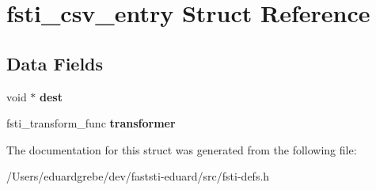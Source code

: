 \hypertarget{structfsti__csv__entry}{}\section{fsti\+\_\+csv\+\_\+entry Struct Reference}
\label{structfsti__csv__entry}
\subsection*{Data Fields}
\begin{DoxyCompactItemize}
\item 
\mbox{\label{structfsti__csv__entry_a6a86c8654ea3c73fcd2af1a9e35dfa3a}} 
void $\ast$ {\bfseries dest}
\item 
\mbox{\label{structfsti__csv__entry_aafde0fea0a3c1bb497a45553c300bd79}} 
fsti\+\_\+transform\+\_\+func {\bfseries transformer}
\end{DoxyCompactItemize}


The documentation for this struct was generated from the following file\+:\begin{DoxyCompactItemize}
\item 
/\+Users/eduardgrebe/dev/faststi-\/eduard/src/fsti-\/defs.\+h\end{DoxyCompactItemize}
